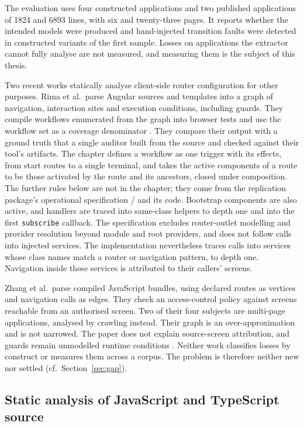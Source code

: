 The evaluation uses four constructed applications and two published
applications of 1824 and 6893 lines, with six and twenty-three pages. It reports whether the
intended models were produced and hand-injected transition faults were detected in constructed
variants of the first sample. Losses on applications the extractor cannot fully analyse are
not measured, and measuring them is the subject of this thesis.

Two recent works statically analyse client-side router configuration for other purposes.
Rima et al.\ parse Angular sources and templates into a graph of navigation, interaction
sites and execution conditions, including guards. They compile workflows enumerated from
the graph into browser tests and use the workflow set as a coverage denominator
\cite{rima2026e2e}. They compare their output with a ground truth that a single auditor built
from the source and checked against their tool's artifacts.
The chapter defines a workflow as one trigger with its effects, from start routes to a single
terminal, and takes the active components of a route to be those activated by the route and its
ancestors, closed under composition. The further rules below are not in the chapter; they come
from the replication package's operational specification
/ and its code. Bootstrap
components are also active, and handlers are traced into same-class helpers to depth one and into
the first \texttt{subscribe} callback. The specification excludes router-outlet modelling and provider
resolution beyond module and root providers, and does not follow calls into injected services. The implementation nevertheless
traces calls into services whose class names match a router or navigation pattern, to depth one. Navigation inside these services is attributed to
their callers' screens.

Zhang et al.\ parse compiled JavaScript bundles, using declared routes as vertices and
navigation calls as edges. They check an access-control policy against screens reachable
from an authorised screen. Two of their four subjects are multi-page applications, analysed
by crawling instead. Their graph is an over-approximation and is not narrowed. The paper does
not explain source-screen attribution, and guards remain unmodelled runtime conditions
\cite{zhang2025veriflow}. Neither work classifies losses by construct
or measures them across a corpus. The problem is therefore neither new nor settled (cf.~Section~\ref{sec:gap}).

\subsection{Static analysis of JavaScript and TypeScript source}
\label{sec:asttools}

